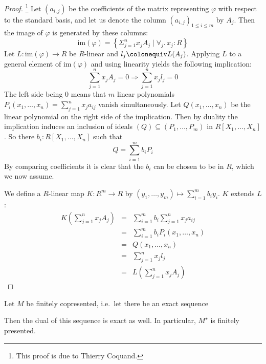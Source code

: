 \begin{proof}\footnote{This proof is due to Thierry Coquand.}
  Let $(a_{i,j})$ be the coefficients of the matrix representing  $\varphi$ with respect to the standard basis, and let us denote the column $(a_{i,j})_{1\leq i\leq m}$ by $A_j$.
  Then the image of $\varphi$ is generated by these columns:
  \[
    \mathrm{im}(\varphi)=\left\{\Sigma_{j=1}^n x_jA_j\mid \forall_j.\, x_j:R\right\}
  \]
  Let $L:\mathrm{im}(\varphi)\to R$ be $R$-linear and $l_j\colonequiv L(A_j)$.
  Applying $L$ to a general element of $\mathrm{im}(\varphi)$ and using linearity yields the following implication:
  \[
    \sum_{j=1}^n x_jA_j = 0 \Rightarrow \sum_{j=1}^n x_jl_j = 0
  \]
  The left side being 0 means that $m$ linear polynomials $P_i(x_1,\dots,x_n)=\sum_{j=1}^n x_ja_{ij} $ vanish simultaneously.
  Let $Q(x_1,\dots,x_n)$ be the linear polynomial on the right side of the implication.
  Then by duality  the implication induces an inclusion of ideals $(Q)\subseteq (P_1,\dots,P_m)$ in $R[X_1,\dots,X_n]$.
  So there $b_i:R[X_1,\dots,X_n]$ such that
  \[
     Q = \sum_{i=1}^m b_iP_i
   \]
   By comparing coefficients it is clear that the $b_i$ can be chosen to be in $R$, which we now assume.
   
   We define a $R$-linear map $K:R^m\to R$ by $(y_1,\dots,y_m)\mapsto\sum_{i=1}^m b_iy_i$.
   $K$ extends $L$:
   \begin{eqnarray*}
     K\left(\sum_{j=1}^n x_jA_j\right) &=&\sum_{i=1}^m b_i\sum_{j=1}^n x_ja_{ij} \\
     &=& \sum_{i=1}^m b_iP_i(x_1,\dots,x_n) \\
     &=& Q(x_1,\dots,x_n) \\
     &=& \sum_{j=1}^n x_jl_j \\
     &=& L\left(\sum_{j=1}^n x_jA_j\right)
   \end{eqnarray*}
\end{proof}

\begin{lemma}
  \label{dual-of-fcop-fp}
  Let $M$ be finitely copresented, i.e.\ let there be an exact sequence
  \begin{center}
  \end{center}
  Then the dual of this sequence is exact as well.
  In particular, $M^\star$ is finitely presented.
\end{lemma}

